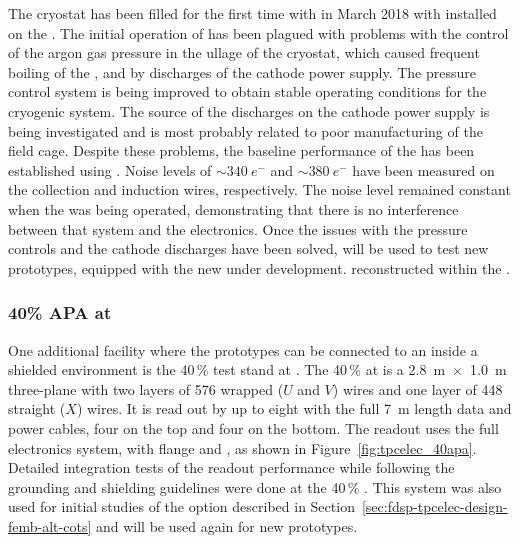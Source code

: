 The  cryostat has been filled for the first time with 
in March 2018 with   installed on the . The
initial operation of  has been plagued with problems with the
control of the argon gas pressure in the ullage of the cryostat, which caused
frequent boiling of the , and by discharges of the cathode power supply. 
The pressure control system is being improved to obtain stable operating conditions
for the cryogenic system. The source of the discharges on the cathode power supply
is being investigated and is most probably related to poor manufacturing of the
field cage. Despite these problems, the baseline performance of the  
 has been established using  . Noise levels of 
$\sim\SI{340}{e^-}$ and $\sim\SI{380}{e^-}$ have been measured on the collection 
and induction wires, respectively. The noise level remained constant when the
 was being operated, demonstrating that there is no interference 
between that system and the  electronics.
Once the issues with the pressure controls and the cathode discharges have been
solved,  will be used to test new  prototypes, equipped
with the new  under development. 
reconstructed within the . 

\subsubsection{40\% APA at }
\label{sec:fdsp-tpcelec-qa-facilities-fortypercent}

One additional facility where the  prototypes can be connected to
an  inside a shielded environment is the \num{40}\,\%  
test stand at . The \num{40}\,\%  at  is a \SI{2.8}{m}~$\times$~\SI{1.0}{m} 
three-plane  with two layers of \num{576} wrapped ($U$ and $V$) wires 
and one layer of \num{448} straight ($X$) wires. It is read out by up to eight 
 with the full \SI{7}{m}  length data and  power 
cables, four on the top and four on the bottom. The readout uses the full  electronics 
system, with  flange and , as shown in Figure~\ref{fig:tpcelec_40apa}. 
Detailed integration tests of the   readout performance while 
following the  grounding and shielding guidelines were done at the \num{40}\,\% 
. This system was also used for initial studies of the  
option described in Section~\ref{sec:fdsp-tpcelec-design-femb-alt-cots} and will
be used again for new  prototypes.

